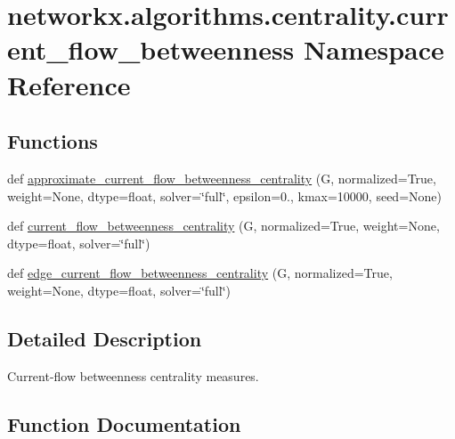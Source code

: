 \hypertarget{namespacenetworkx_1_1algorithms_1_1centrality_1_1current__flow__betweenness}{}\section{networkx.\+algorithms.\+centrality.\+current\+\_\+flow\+\_\+betweenness Namespace Reference}
\label{namespacenetworkx_1_1algorithms_1_1centrality_1_1current__flow__betweenness}
\subsection*{Functions}
\begin{DoxyCompactItemize}
\item 
def \hyperlink{namespacenetworkx_1_1algorithms_1_1centrality_1_1current__flow__betweenness_a0fa2bfad56b5d89fb856c282311bf015}{approximate\+\_\+current\+\_\+flow\+\_\+betweenness\+\_\+centrality} (G, normalized=True, weight=None, dtype=float, solver=\char`\"{}full\char`\"{}, epsilon=0., kmax=10000, seed=None)
\item 
def \hyperlink{namespacenetworkx_1_1algorithms_1_1centrality_1_1current__flow__betweenness_a8664ba78d7d3b03a17068ced8fa35c7a}{current\+\_\+flow\+\_\+betweenness\+\_\+centrality} (G, normalized=True, weight=None, dtype=float, solver=\char`\"{}full\char`\"{})
\item 
def \hyperlink{namespacenetworkx_1_1algorithms_1_1centrality_1_1current__flow__betweenness_a7ccd37252731f66553392edb448cf4c3}{edge\+\_\+current\+\_\+flow\+\_\+betweenness\+\_\+centrality} (G, normalized=True, weight=None, dtype=float, solver=\char`\"{}full\char`\"{})
\end{DoxyCompactItemize}


\subsection{Detailed Description}
\begin{DoxyVerb}Current-flow betweenness centrality measures.\end{DoxyVerb}
 

\subsection{Function Documentation}
\mbox{\label{namespacenetworkx_1_1algorithms_1_1centrality_1_1current__flow__betweenness_a0fa2bfad56b5d89fb856c282311bf015}} 
